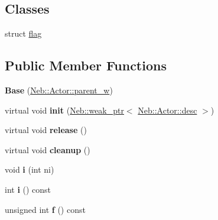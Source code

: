 \subsection*{\-Classes}
\begin{DoxyCompactItemize}
\item 
struct \hyperlink{structNeb_1_1Actor_1_1Base_1_1flag}{flag}
\end{DoxyCompactItemize}
\subsection*{\-Public \-Member \-Functions}
\begin{DoxyCompactItemize}
\item 
\hypertarget{classNeb_1_1Actor_1_1Base_ac45498cb0a5b4cfa704c7780a866cf0b}{{\bfseries \-Base} (\hyperlink{classNeb_1_1weak__ptr}{\-Neb\-::\-Actor\-::parent\-\_\-w})}\label{classNeb_1_1Actor_1_1Base_ac45498cb0a5b4cfa704c7780a866cf0b}

\item 
\hypertarget{classNeb_1_1Actor_1_1Base_ad828b2ea79bfe137650a683a5ff253b9}{virtual void {\bfseries init} (\hyperlink{classNeb_1_1weak__ptr}{\-Neb\-::weak\-\_\-ptr}$<$ \hyperlink{classNeb_1_1Actor_1_1desc}{\-Neb\-::\-Actor\-::desc} $>$)}\label{classNeb_1_1Actor_1_1Base_ad828b2ea79bfe137650a683a5ff253b9}

\item 
\hypertarget{classNeb_1_1Actor_1_1Base_a19d7b3eeac560db781b8dd9d7a044bef}{virtual void {\bfseries release} ()}\label{classNeb_1_1Actor_1_1Base_a19d7b3eeac560db781b8dd9d7a044bef}

\item 
\hypertarget{classNeb_1_1Actor_1_1Base_a2368293ffeb3a2bee634a6b361171705}{virtual void {\bfseries cleanup} ()}\label{classNeb_1_1Actor_1_1Base_a2368293ffeb3a2bee634a6b361171705}

\item 
\hypertarget{classNeb_1_1Actor_1_1Base_a732e42c211856137d5fa55d041606805}{void {\bfseries i} (int ni)}\label{classNeb_1_1Actor_1_1Base_a732e42c211856137d5fa55d041606805}

\item 
\hypertarget{classNeb_1_1Actor_1_1Base_a8b8facad0502a876dec354116069fc00}{int {\bfseries i} () const }\label{classNeb_1_1Actor_1_1Base_a8b8facad0502a876dec354116069fc00}

\item 
\hypertarget{classNeb_1_1Actor_1_1Base_ab093290863fcedd9ef36828de4438401}{unsigned int {\bfseries f} () const }\label{classNeb_1_1Actor_1_1Base_ab093290863fcedd9ef36828de4438401}


\end{DoxyCompactItemize}
